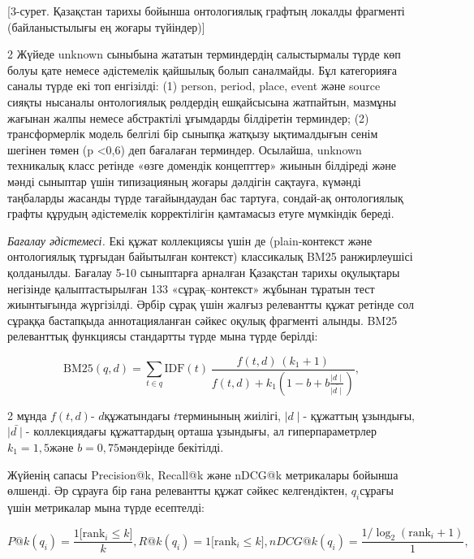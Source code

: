 [3-сурет. Қазақстан тарихы бойынша онтологиялық графтың локалды
фрагменті (байланыстылығы ең жоғары түйіндер)]

\begin{multicols}{2}
Жүйеде unknown сыныбына жататын терминдердің салыстырмалы түрде көп
болуы қате немесе әдістемелік қайшылық болып саналмайды. Бұл категорияға
саналы түрде екі топ енгізілді: (1) person, period, place, event және
source сияқты нысаналы онтологиялық рөлдердің ешқайсысына жатпайтын,
мазмұны жағынан жалпы немесе абстрактілі ұғымдарды білдіретін терминдер;
(2) трансформерлік модель белгілі бір сыныпқа жатқызу ықтималдығын сенім
шегінен төмен (p <0,6) деп бағалаған терминдер. Осылайша,
unknown техникалық класс ретінде «өзге домендік концепттер» жиынын
білдіреді және мәнді сыныптар үшін типизацияның жоғары дәлдігін
сақтауға, күмәнді таңбаларды жасанды түрде тағайындаудан бас тартуға,
сондай-ақ онтологиялық графты құрудың әдістемелік корректілігін
қамтамасыз етуге мүмкіндік береді.

\emph{Бағалау әдістемесі.} Екі құжат коллекциясы үшін де (plain-контекст
және онтологиялық тұрғыдан байытылған контекст) классикалық BM25
ранжирлеушісі қолданылды. Бағалау 5-10 сыныптарға арналған Қазақстан
тарихы оқулықтары негізінде қалыптастырылған 133 «сұрақ--контекст»
жұбынан тұратын тест жиынтығында жүргізілді. Әрбір сұрақ үшін жалғыз
релевантты құжат ретінде сол сұраққа бастапқыда аннотацияланған сәйкес
оқулық фрагменті алынды. BM25 релеванттық функциясы стандартты түрде
мына түрде берілді:
\end{multicols}
\vspace{-0.5em}
\[\text{BM25}(q,d) = \sum_{t \in q}^{}{\text{IDF}(t)\text{ }}\frac{f(t,d)\text{ }(k_{1} + 1)}{f(t,d) + k_{1}\left( 1 - b + b\frac{\mid d \mid}{\bar{\mid d \mid}} \right)},\]

\begin{multicols}{2}
мұнда \(f(t,d)\)- \(d\)құжатындағы \(t\)терминының жиілігі,
\(\mid d \mid\)- құжаттың ұзындығы, \(\bar{\mid d \mid}\)- коллекциядағы
құжаттардың орташа ұзындығы, ал гиперпараметрлер \(k_{1} = 1,5\)және
\(b = 0,75\)мәндерінде бекітілді.

Жүйенің сапасы Precision@k, Recall@k және nDCG@k метрикалары бойынша
өлшенді. Әр сұрауға бір ғана релевантты құжат сәйкес келгендіктен,
\(q_{i}\)сұрағы үшін метрикалар мына түрде есептелді:
\end{multicols}

\[P@k(q_{i}) = \frac{1\lbrack\text{rank}_{i} \leq k\rbrack}{k},R@k(q_{i}) = 1\lbrack\text{rank}_{i} \leq k\rbrack,nDCG@k(q_{i}) = \frac{1/{\log}_{2}(\text{rank}_{i} + 1)}{1},
\]

